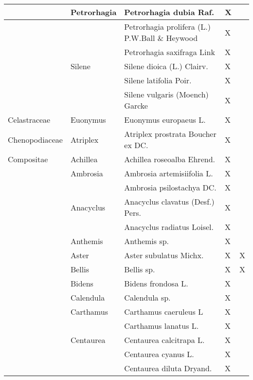 \documentclass[main.tex]{subfiles}
\begin{document}
    \clearpage
        
        \begin{table}[!ht]
        \centering
    \begin{tabular}[\footnotesize]{|p{2.4cm}|p{1.9cm}|p{5.8cm}|p{1.1cm}|p{1cm}|}
    \hline
        ~ & Petrorhagia & Petrorhagia dubia Raf. & X & ~ \\ \hline
        ~ & ~ & Petrorhagia prolifera (L.) P.W.Ball \& Heywood & X & ~ \\ \hline
        ~ & ~ & Petrorhagia saxifraga Link & X & ~ \\ \hline
        ~ & Silene & Silene dioica (L.) Clairv. & X & ~ \\ \hline
        ~ & ~ & Silene latifolia Poir. & X & ~ \\ \hline
        ~ & ~ & Silene vulgaris (Moench) Garcke & X & ~ \\ \hline
        Celastraceae & Euonymus & Euonymus europaeus L. & X & ~ \\ \hline
        Chenopodiaceae & Atriplex & Atriplex prostrata Boucher ex DC. & X & ~ \\ \hline
        Compositae & Achillea & Achillea roseoalba Ehrend. & X & ~ \\ \hline
        ~ & Ambrosia & Ambrosia artemisiifolia L. & X & ~ \\ \hline
        ~ & ~ & Ambrosia psilostachya DC. & X & ~ \\ \hline
        ~ & Anacyclus & Anacyclus clavatus (Desf.) Pers. & X & ~ \\ \hline
        ~ & ~ & Anacyclus radiatus Loisel. & X & ~ \\ \hline
        ~ & Anthemis & Anthemis sp. & X & ~ \\ \hline
        ~ & Aster & Aster subulatus Michx. & X & X \\ \hline
        ~ & Bellis & Bellis sp. & X & X \\ \hline
        ~ & Bidens & Bidens frondosa L. & X & ~ \\ \hline
        ~ & Calendula & Calendula sp. & X & ~ \\ \hline
        ~ & Carthamus & Carthamus caeruleus L & X & ~ \\ \hline
        ~ & ~ & Carthamus lanatus L. & X & ~ \\ \hline
        ~ & Centaurea & Centaurea calcitrapa L. & X & ~ \\ \hline
        ~ & ~ & Centaurea cyanus L. & X & ~ \\ \hline
        ~ & ~ & Centaurea diluta Dryand. & X & ~ \\ \hline

\end{tabular}
\end{table}
\end{document}
